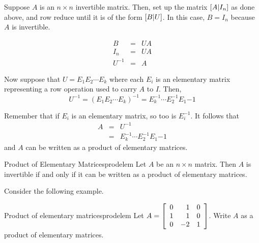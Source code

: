 Suppose $A$ is an $n \times n$ invertible matrix. Then, set up the matrix $\left[ A | I_n \right]$ as done above, and row reduce until it is of the form $\left[ B | U \right]$. In this case, $B = I_n$ because $A$ is invertible. 

\begin{eqnarray*}
B &=& UA \\
I_n &=& UA \\
U^{-1} &=& A 
\end{eqnarray*}

Now suppose that $U = E_1 E_2 \cdots E_k$ where each $E_i$ is an elementary matrix representing a row operation used to carry $A$ to $I$. Then, 
\[
U^{-1} = \left( E_1 E_2 \cdots E_k \right) ^{-1}  =  E_k^{-1} \cdots E_2^{-1} E_1{-1} 
\]

Remember that if $E_i$ is an elementary matrix, so too is $E_i^{-1}$. 
It follows that 
\begin{eqnarray*}
A&=& U^{-1} \\
&=&  E_k^{-1} \cdots E_2^{-1} E_1{-1}
\end{eqnarray*}
and $A$ can be written as a product of elementary matrices. 

\begin{theorem}{Product of Elementary Matrices}{prodelem}
Let $A$ be an $n \times n$ matrix. Then $A$ is invertible if and only if it can be written as a product of elementary matrices.
\end{theorem}

Consider the following example.

\begin{example}{Product of elementary matrices}{prodelem}
Let $A = \left[
\begin{array}{rrr}
0 & 1 & 0 \\
1 & 1 & 0 \\
0 & -2 & 1 
\end{array} \right]$. 
Write $A$ as a product of elementary matrices. 
\end{example}

